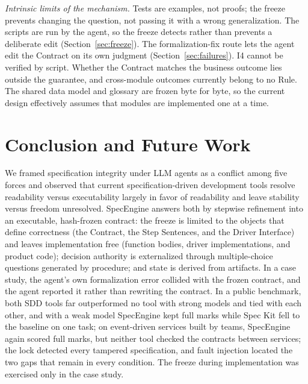 \documentclass[conference]{IEEEtran}
\begin{document}
\emph{Intrinsic limits of the mechanism.} Tests are examples, not proofs; the freeze prevents changing the question, not passing it with a wrong generalization. The scripts are run by the agent, so the freeze detects rather than prevents a deliberate edit (Section~\ref{sec:freeze}). The formalization-fix route lets the agent edit the Contract on its own judgment (Section~\ref{sec:failures}). I4 cannot be verified by script. Whether the Contract matches the business outcome lies outside the guarantee, and cross-module outcomes currently belong to no Rule. The shared data model and glossary are frozen byte for byte, so the current design effectively assumes that modules are implemented one at a time.

\section{Conclusion and Future Work}\label{sec:conclusion}

We framed specification integrity under LLM agents as a conflict among five forces and observed that current specification-driven development tools resolve readability versus executability largely in favor of readability and leave stability versus freedom unresolved. SpecEngine answers both by stepwise refinement into an executable, hash-frozen contract: the freeze is limited to the objects that define correctness (the Contract, the Step Sentences, and the Driver Interface) and leaves implementation free (function bodies, driver implementations, and product code); decision authority is externalized through multiple-choice questions generated by procedure; and state is derived from artifacts. In a case study, the agent's own formalization error collided with the frozen contract, and the agent reported it rather than rewriting the contract. In a public benchmark, both SDD tools far outperformed no tool with strong models and tied with each other, and with a weak model SpecEngine kept full marks while Spec Kit fell to the baseline on one task; on event-driven services built by teams, SpecEngine again scored full marks, but neither tool checked the contracts between services; the lock detected every tampered specification, and fault injection located the two gaps that remain in every condition. The freeze during implementation was exercised only in the case study.
\end{document}
